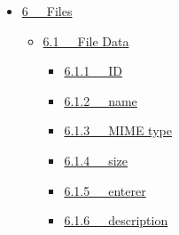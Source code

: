 \documentclass[letterpaper,10pt,english]{sphinxmanual}
\begin{document}
{\begin{minipage}{0.95\linewidth}
\begin{itemize}
\begin{itemize}
\item {} 
{\hyperref[documentation:other-form-actions]{5.5   Other Form Actions}}
\begin{itemize}
\item {} 
{\hyperref[documentation:update]{5.5.1   update}}

\item {} 
{\hyperref[documentation:delete]{5.5.2   delete}}

\item {} 
{\hyperref[documentation:history]{5.5.3   history}}

\item {} 
{\hyperref[documentation:associate]{5.5.4   associate}}

\item {} 
{\hyperref[documentation:remember]{5.5.5   remember}}

\item {} 
{\hyperref[documentation:export]{5.5.6   export}}

\item {} 
{\hyperref[documentation:export-all]{5.5.7   export all}}

\item {} 
{\hyperref[documentation:remember-all]{5.5.8   remember all}}

\end{itemize}

\end{itemize}

\item {} 
{\hyperref[documentation:files]{6   Files}}
\begin{itemize}
\item {} 
{\hyperref[documentation:file-data]{6.1   File Data}}
\begin{itemize}
\item {} 
{\hyperref[documentation:id1]{6.1.1   ID}}

\item {} 
{\hyperref[documentation:name]{6.1.2   name}}

\item {} 
{\hyperref[documentation:mime-type]{6.1.3   MIME type}}

\item {} 
{\hyperref[documentation:size]{6.1.4   size}}

\item {} 
{\hyperref[documentation:id2]{6.1.5   enterer}}

\item {} 
{\hyperref[documentation:description]{6.1.6   description}}


\end{itemize}
\end{itemize}
\end{itemize}
\end{minipage}}
\end{document}
